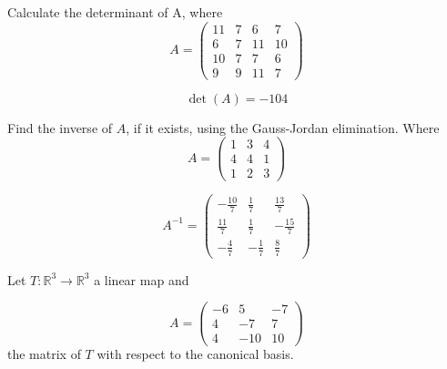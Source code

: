 \begin{questions}

\question Calculate the determinant of A, where
$$
A=\left(\begin{array}{rrrr}
11 & 7 & 6 & 7 \\
6 & 7 & 11 & 10 \\
10 & 7 & 7 & 6 \\
9 & 9 & 11 & 7
\end{array}\right)
$$

\begin{solution}
$$\det(A)=-104$$
\end{solution}

\question Find the inverse of $A$, if it exists, using the Gauss-Jordan elimination. Where
$$
A=\left(\begin{array}{rrr}
1 & 3 & 4 \\
4 & 4 & 1 \\
1 & 2 & 3
\end{array}\right)
$$

\begin{solution}
$$A^{-1}=\left(\begin{array}{rrr}
-\frac{10}{7} & \frac{1}{7} & \frac{13}{7} \\
\frac{11}{7} & \frac{1}{7} & -\frac{15}{7} \\
-\frac{4}{7} & -\frac{1}{7} & \frac{8}{7}
\end{array}\right)$$
\end{solution}

\question Let $T:\mathbb{R}^3\rightarrow\mathbb{R}^3$  a linear map and
 
$$
A=\left(\begin{array}{rrr}
-6 & 5 & -7 \\
4 & -7 & 7 \\
4 & -10 & 10
\end{array}\right)
$$
the matrix of $T$ with respect to the canonical basis.
\end{questions}
